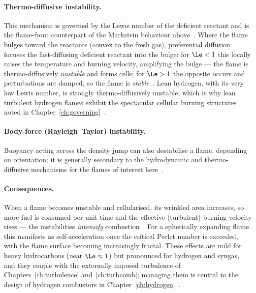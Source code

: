\paragraph{Thermo-diffusive instability.}
This mechanism is governed by the Lewis number of the deficient reactant and is the flame-front counterpart of the Markstein behaviour above~\cite{oppong2022instability}. Where the flame bulges toward the reactants (convex to the fresh gas), preferential diffusion focuses the fast-diffusing deficient reactant into the bulge: for $\Le<1$ this locally raises the temperature and burning velocity, amplifying the bulge --- the flame is thermo-diffusively \emph{unstable} and forms cells; for $\Le>1$ the opposite occurs and perturbations are damped, so the flame is \emph{stable}~\cite{oppong2022instability,lecture9}. Lean hydrogen, with its very low Lewis number, is strongly thermo-diffusively unstable, which is why lean turbulent hydrogen flames exhibit the spectacular cellular burning structures noted in Chapter~\ref{ch:governing}~\cite{day2009cellular,lecture8}.

\paragraph{Body-force (Rayleigh--Taylor) instability.}
Buoyancy acting across the density jump can also destabilise a flame, depending on orientation; it is generally secondary to the hydrodynamic and thermo-diffusive mechanisms for the flames of interest here~\cite{oppong2022instability}.

\paragraph{Consequences.}
When a flame becomes unstable and cellularised, its wrinkled area increases, so more fuel is consumed per unit time and the effective (turbulent) burning velocity rises --- the instabilities \emph{intensify} combustion~\cite{oppong2022instability}. For a spherically expanding flame this manifests as self-acceleration once the critical Peclet number is exceeded, with the flame surface becoming increasingly fractal. These effects are mild for heavy hydrocarbons (near $\Le\approx1$) but pronounced for hydrogen and syngas, and they couple with the externally imposed turbulence of Chapters~\ref{ch:turbulence} and~\ref{ch:turbcomb}; managing them is central to the design of hydrogen combustors in Chapter~\ref{ch:hydrogen}~\cite{oppong2022instability,lecture14}.
